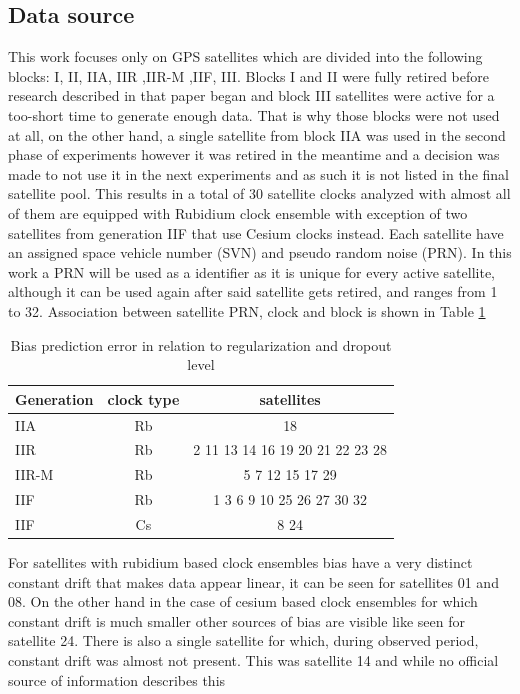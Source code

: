 \documentclass{article}
\begin{document}
\subsection{Data source}
This work focuses only on GPS satellites which are divided into the following blocks:
I, II, IIA, IIR ,IIR-M ,IIF, III.
Blocks I and II were fully retired before research described in that paper began and block
III satellites were active for a too-short time to generate enough data.
That is why those blocks were not used at all, on the other hand, a single satellite from block
IIA was used in the second phase of experiments however it was retired in the meantime and a decision
was made to not use it in the next experiments and as such it is not listed in the final satellite pool.
This results in a total of 30 satellite clocks analyzed with almost all of them are equipped with Rubidium clock ensemble with exception of two satellites from generation IIF 
that use Cesium clocks instead.
Each satellite have an assigned space vehicle number (SVN) and pseudo random noise (PRN).
In this work a PRN will be used as a identifier as it is unique for every active satellite, 
although it can be used again after said satellite gets retired, and ranges from 1 to 32.
Association between satellite PRN, clock and block is shown in Table \ref{table:prn}
\begin{table}[htb] \label{table:prn}
\parindent0pt
\caption{Bias prediction error in relation to regularization and dropout level}
\centering
\begin{tabular}{ l  c  c }
  \hline
  \hline
  Generation& clock type& satellites\\  \hline
  IIA & Rb& 18\\  
  IIR & Rb& 2 11 13 14 16 19 20 21 22 23 28\\ 
  IIR-M & Rb& 5 7 12 15 17 29\\ 
  IIF & Rb& 1 3 6 9 10 25 26 27 30 32\\ 
  IIF & Cs& 8 24 \\ \hline \hline
 \end{tabular}
\end{table}
For satellites with rubidium based clock ensembles bias have a very distinct constant drift
that makes data appear linear, it can be seen for satellites 01 and 08. 
On the other hand in the case of cesium based clock ensembles for which constant drift is much 
smaller other sources of bias are visible like seen for satellite 24.
There is also a single satellite for which, during observed period, constant drift was almost
not present. This was satellite 14 and while no official source of information describes this 
\end{document}
